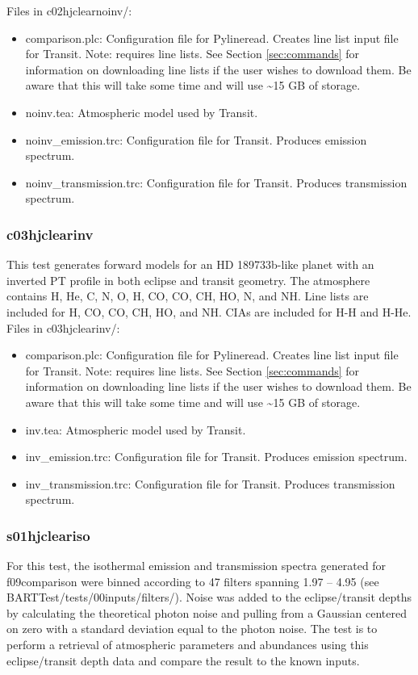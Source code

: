 \documentclass[letterpaper, 12pt]{article}
\begin{document}
Files in c02hjclearnoinv/:
\begin{itemize} \itemsep0pt
  \item comparison.plc: Configuration file for Pylineread. Creates 
        line list input file for Transit. Note: requires line lists. See 
        Section \ref{sec:commands} for information on downloading line lists if 
        the user wishes to download them. Be aware that this will take some 
        time and will use {\sim}15 GB of storage.
  \item noinv.tea: Atmospheric model used by Transit.
  \item noinv{\_}emission.trc: Configuration file for Transit. Produces 
        emission spectrum.
  \item noinv{\_}transmission.trc: Configuration file for Transit. Produces 
        transmission spectrum.
\end{itemize}

\subsubsection{c03hjclearinv}
\label{sec:comp-inv}
This test generates forward models for an HD 189733b-like planet with an inverted PT profile in both eclipse and transit geometry. The atmosphere contains H, He, C, N, O, H, 
CO, CO, CH, HO, N, and NH. Line lists are 
included for H, CO, CO, CH, HO, and NH. CIAs 
are included for H-H and H-He.\\

Files in c03hjclearinv/:
\begin{itemize} \itemsep0pt
  \item comparison.plc: Configuration file for Pylineread. Creates 
        line list input file for Transit. Note: requires line lists. See 
        Section \ref{sec:commands} for information on downloading line lists if 
        the user wishes to download them. Be aware that this will take some 
        time and will use {\sim}15 GB of storage.
  \item inv.tea: Atmospheric model used by Transit.
  \item inv{\_}emission.trc: Configuration file for Transit. Produces 
        emission spectrum.
  \item inv{\_}transmission.trc: Configuration file for Transit. Produces 
        transmission spectrum.
\end{itemize}

\subsubsection{s01hjcleariso}
\label{sec:retrievals}
For this test, the isothermal emission and transmission spectra generated for 
f09comparison were binned according to 47 filters spanning 
1.97 -- 4.95 \microns (see BARTTest/tests/00inputs/filters/). 
Noise was added to the eclipse/transit 
depths by calculating the theoretical photon noise and pulling from a Gaussian 
centered on zero with a standard deviation equal to the photon noise. The test 
is to perform a retrieval of atmospheric parameters and abundances using this 
eclipse/transit depth data and compare the result to the known inputs.
\end{document}

